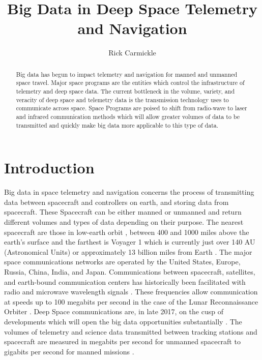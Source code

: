 \documentclass[sigconf]{acmart}
\begin{document}
\title{Big Data in Deep Space Telemetry and Navigation}


\author{Rick Carmickle}


\renewcommand{\shortauthors}{R, Carmickle}


\begin{abstract}
Big data has begun to impact telemetry and navigation for manned and unmanned space travel. Major space programs are the entities which control the infrastructure of telemetry and deep space data. The current bottleneck in the volume, variety, and veracity of deep space and telemetry data is the transmission technology uses to communicate across space. Space Programs are poised to shift from radio-wave to laser and infrared communication methods which will allow greater volumes of data to be transmitted and quickly make big data more applicable to this type of data.   
\end{abstract}




\maketitle



\section{Introduction}
Big data in space telemetry and navigation concerns the process of transmitting data between spacecraft and controllers on earth, and storing data from spacecraft. These Spacecraft can be either manned or unmanned and return different volumes and types of data depending on their purpose. The nearest spacecraft are those in low-earth orbit \cite{Allain2015}, between 400 and 1000 miles above the earth's surface and the farthest is Voyager 1 which is currently just over 140 AU (Astronomical Units) or approximately 13 billion miles from Earth \cite{Laboratory2017}. The major space communications networks are operated by the United States, Europe, Russia, China, India, and Japan. Communications between spacecraft, satellites, and earth-bound communication centers has historically been facilitated with radio and microwave wavelength signals \cite{Bricker1990}. These frequencies allow communication at speeds up to 100 megabits per second in the case of the Lunar Reconnaissance Orbiter \cite{Hsu2010}. Deep Space communications are, in late 2017, on the cusp of developments which will open the big data opportunities substantially \cite{Laboratory2017a}. The volumes of telemetry and science data transmitted between tracking stations and spacecraft are measured in megabits per second for unmanned spacecraft to gigabits per second for manned missions \cite{Hsu2010}. 
\end{document}
